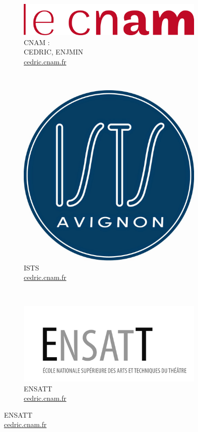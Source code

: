 \documentclass{beamer}
\begin{document}
\begin{frame}
\begin{figure}[htbp]
    
    \begin{subfigure}[b]{0.25\textwidth} 
        \centering
        \includegraphics[scale=0.25]{images/cnam.png}
        \caption[]{CNAM : \\ CEDRIC, ENJMIN\\ \url{cedric.cnam.fr}}
    \end{subfigure}
    ~
    \begin{subfigure}[b]{0.25\textwidth} 
        \centering
        \includegraphics[scale=0.05]{images/ists.jpg}
        \caption[]{ISTS\\ \url{cedric.cnam.fr}}
    \end{subfigure}
    ~
    \begin{subfigure}[b]{0.25\textwidth} 
        \centering
        \includegraphics[scale=0.23]{images/ensatt.jpg}
        \caption[]{ENSATT\\ \url{cedric.cnam.fr}}
    \end{subfigure}    
\end{figure} 
    

\end{frame}
\end{document}
